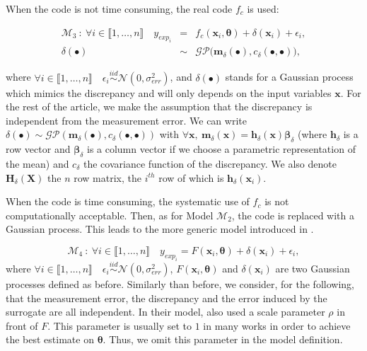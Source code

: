 \documentclass[soumission]{jsfds}
\edef\hc{\string: }
\begin{document}
When the code is not time consuming, the real code $f_c$ is used\hc

\begin{eqnarray}
\mathcal{M}_3 \ : \ \forall i \in \llbracket1,\dots,n\rrbracket \quad y_{exp_i}&=& f_c(\boldsymbol{x}_i,\boldsymbol{\theta})+\delta(\boldsymbol{x}_i)+\epsilon_i,
\label{eq:M3}\\
\delta(\bullet) & \sim &{\mathcal{GP}}{\Big(\boldsymbol{m}_{\delta}(\bullet),c_{\delta}(\bullet,\bullet)\Big)},
\nonumber
\end{eqnarray}

where $\forall i \in \llbracket1,\dots,n\rrbracket \quad \epsilon_i\overset{iid}{\sim}\mathcal{N}(0,\sigma_{err}^2)$, and $\delta(\bullet)$ stands for a Gaussian process which mimics the discrepancy and will only depends on the input variables $\boldsymbol{x}$. For the rest of the article, we make the assumption that the discrepancy is independent from the measurement error. We can write $\delta(\bullet)\sim\mathcal{GP}(\boldsymbol{m}_{\delta}(\bullet),c_{\delta}(\bullet,\bullet))$ with $\forall \boldsymbol{x}, \ \boldsymbol{m}_{\delta}(\boldsymbol{x})={\boldsymbol{h}_{\delta}}(\boldsymbol{x})\boldsymbol{\beta}_{\delta}$ (where $\boldsymbol{h}_{\delta}$ is a row vector and $\boldsymbol{\beta}_{\delta}$ is a column vector if we choose a parametric representation of the mean) and $c_{\delta}$ the covariance function of the discrepancy. We also denote $\boldsymbol{H}_{\delta}(\boldsymbol{X})$ the $n$ row matrix, the $i^{th}$ row of which is $\boldsymbol{h}_{\delta}(\boldsymbol{x}_i)$.\newline

When the code is time consuming, the systematic use of $f_c$ is not computationally acceptable.
Then, as for Model $\mathcal{M}_2$, the code is replaced with a Gaussian process. This leads to the more generic model introduced in \citet{kennedy2001}.

% 

\begin{equation}
\mathcal{M}_4 \ : \ \forall i \in \llbracket1,\dots,n\rrbracket \quad y_{exp_i}= F(\boldsymbol{x}_i,\boldsymbol{\theta})+\delta(\boldsymbol{x}_i)+\epsilon_i,
\label{eq:M3p}
\end{equation}
where $\forall i \in \llbracket1,\dots,n\rrbracket \quad \epsilon_i\overset{iid}{\sim}\mathcal{N}(0,\sigma_{err}^2)$, $F(\boldsymbol{x}_i,\boldsymbol{\theta})$ and $\delta(\boldsymbol{x}_i)$ are two Gaussian
processes defined as before. Similarly than before, we consider, for the following, that the measurement error, the discrepancy and the error induced by the surrogate are all independent.
In their model, \citet{kennedy2001} also used a scale parameter $\rho$ in front of $F$.
This parameter is usually set to $1$ in many works  in order to achieve the best estimate on $\boldsymbol{\theta}$.
Thus, we omit this parameter in the model definition.
\newline
\end{document}
